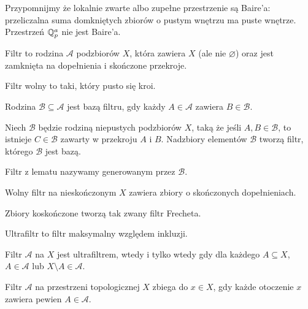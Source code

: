 Przypomnijmy że lokalnie zwarte albo zupełne przestrzenie są Baire'a: przeliczalna suma domkniętych zbiorów o pustym wnętrzu ma puste wnętrze.
Przestrzeń $\mathbb Q_p^a$ nie jest Baire'a. %

\begin{definicja}
	Filtr to rodzina $\mathcal A$ podzbiorów $X$, która zawiera $X$ (ale nie $\varnothing$) oraz jest zamknięta na dopełnienia i skończone przekroje.
\end{definicja}

\begin{definicja}
	Filtr wolny to taki, który pusto się kroi.
\end{definicja}

\begin{definicja}
	Rodzina $\mathcal B \subseteq \mathcal A$ jest bazą filtru, gdy każdy $A \in \mathcal A$ zawiera $B \in \mathcal B$.
\end{definicja}

\begin{lemat}
	Niech $\mathcal B$ będzie rodziną niepustych podzbiorów $X$, taką że jeśli $A, B \in \mathcal B$, to istnieje $C \in \mathcal B$ zawarty w przekroju $A$ i $B$.
	Nadzbiory elementów $\mathcal B$ tworzą filtr, którego $\mathcal B$ jest bazą.
\end{lemat}

Filtr z lematu nazywamy generowanym przez $\mathcal B$.

\begin{lemat}
	Wolny filtr na nieskończonym $X$ zawiera zbiory o skończonych dopełnieniach.
\end{lemat}

Zbiory koskończone tworzą tak zwany filtr Frecheta.

\begin{definicja}
	Ultrafiltr to filtr maksymalny względem inkluzji.
\end{definicja}

\begin{fakt}
	Filtr $\mathcal A$ na $X$ jest ultrafiltrem, wtedy i tylko wtedy gdy dla każdego $A \subseteq X$, $A \in \mathcal A$ lub $X \setminus A \in \mathcal A$.
\end{fakt}

\begin{definicja}
	Filtr $\mathcal A$ na przestrzeni topologicznej $X$ zbiega do $x \in X$, gdy każde otoczenie $x$ zawiera pewien $A \in \mathcal A$.
\end{definicja}

